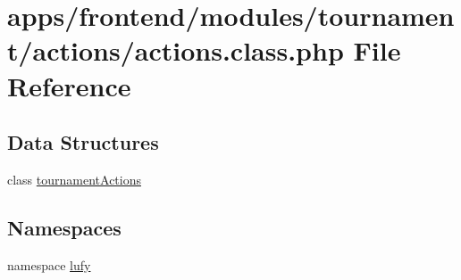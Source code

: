 \hypertarget{frontend_2modules_2tournament_2actions_2actions_8class_8php}{\section{apps/frontend/modules/tournament/actions/actions.class.\-php File Reference}
\label{frontend_2modules_2tournament_2actions_2actions_8class_8php}
}
\subsection*{Data Structures}
\begin{DoxyCompactItemize}
\item 
class \hyperlink{classtournament_actions}{tournament\-Actions}
\end{DoxyCompactItemize}
\subsection*{Namespaces}
\begin{DoxyCompactItemize}
\item 
namespace \hyperlink{namespacelufy}{lufy}
\end{DoxyCompactItemize}
